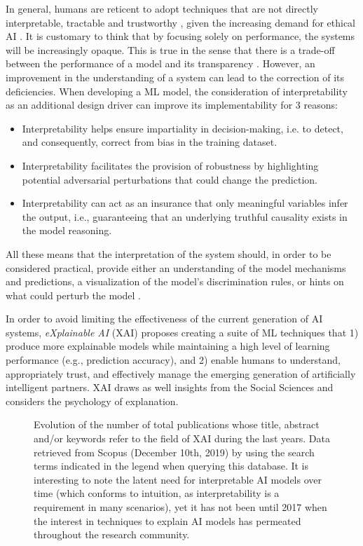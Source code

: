 \documentclass[final]{elsarticle}
\begin{document}
In general, humans are reticent to adopt techniques that are not directly interpretable, tractable and trustworthy \cite{Zhu18}, given the increasing demand for ethical AI \cite{goodman2017Fair}. It is customary to think that by focusing solely on performance, the systems will be increasingly opaque. This is true in the sense that there is a trade-off between the performance of a model and its transparency \cite{Dosilovic18}. However, an improvement in the understanding of a system can lead to the correction of its deficiencies. When developing a ML model, the consideration of interpretability as an additional design driver can improve its implementability for 3 reasons: 
\begin{itemize}[leftmargin=*]
\item Interpretability helps ensure impartiality in decision-making, i.e. to detect, and consequently, correct from bias in the training dataset.
\item Interpretability facilitates the provision of robustness by highlighting potential adversarial perturbations that could change the prediction. 
\item Interpretability can act as an insurance that only meaningful variables infer the output, i.e., guaranteeing that an underlying truthful causality exists in the model reasoning.
\end{itemize}

All these means that the interpretation of the system should, in order to be considered practical, provide either an understanding of the model mechanisms and predictions, a visualization of the model's discrimination rules, or hints on what could perturb the model \cite{Hall2018}.

In order to avoid limiting the effectiveness of the current generation of AI systems, \textit{eXplainable AI} (XAI) \cite{gunning2017explainable} proposes creating a suite of ML techniques that 1) produce more explainable models while maintaining a high level of learning performance (e.g., prediction accuracy), and 2) enable humans to understand, appropriately trust, and effectively manage the emerging generation of artificially intelligent partners. XAI draws as well insights from the Social Sciences \cite{Miller19} and considers the psychology of explanation. 
\begin{figure}[htpb]
        \caption{Evolution of the number of total publications whose title, abstract and/or keywords refer to the field of XAI during the last years. Data retrieved from Scopus\textsuperscript{\textregistered} {\color{black}(December 10th, 2019) by using the search terms indicated in the legend when querying this database}. It is interesting to note the latent need for interpretable AI models over time (which conforms to intuition, as interpretability is a requirement in many scenarios), yet it has not been until 2017 when the interest in techniques to explain AI models has permeated throughout the research community.}
        \label{fig:xAITrend}
      \end{figure}
      
\end{document}
